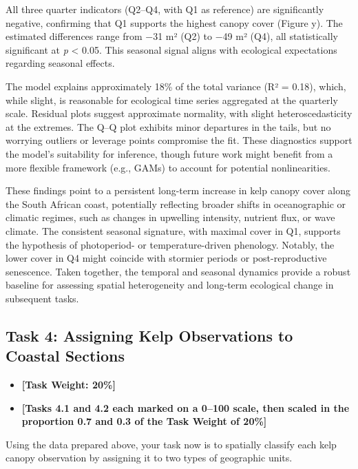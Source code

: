 \documentclass[
  british,
  10pt,
]{article}
\providecommand{\tightlist}{%
  \setlength{\itemsep}{0pt}\setlength{\parskip}{0pt}}
\begin{document}
All three quarter indicators (Q2--Q4, with Q1 as reference) are
significantly negative, confirming that Q1 supports the highest canopy
cover (Figure y). The estimated differences range from −31 m² (Q2) to
−49 m² (Q4), all statistically significant at \emph{p} \textless{} 0.05.
This seasonal signal aligns with ecological expectations regarding
seasonal effects.

The model explains approximately 18\% of the total variance (R² = 0.18),
which, while slight, is reasonable for ecological time series aggregated
at the quarterly scale. Residual plots suggest approximate normality,
with slight heteroscedasticity at the extremes. The Q--Q plot exhibits
minor departures in the tails, but no worrying outliers or leverage
points compromise the fit. These diagnostics support the model's
suitability for inference, though future work might benefit from a more
flexible framework (e.g., GAMs) to account for potential nonlinearities.

These findings point to a persistent long-term increase in kelp canopy
cover along the South African coast, potentially reflecting broader
shifts in oceanographic or climatic regimes, such as changes in
upwelling intensity, nutrient flux, or wave climate. The consistent
seasonal signature, with maximal cover in Q1, supports the hypothesis of
photoperiod- or temperature-driven phenology. Notably, the lower cover
in Q4 might coincide with stormier periods or post-reproductive
senescence. Taken together, the temporal and seasonal dynamics provide a
robust baseline for assessing spatial heterogeneity and long-term
ecological change in subsequent tasks.

\subsection{Task 4: Assigning Kelp Observations to Coastal
Sections}\label{task-4-assigning-kelp-observations-to-coastal-sections}

\begin{itemize}
\tightlist
\item
  \textbf{{[}Task Weight: 20\%{]}}
\item
  \textbf{{[}Tasks 4.1 and 4.2 each marked on a 0--100 scale, then
  scaled in the proportion 0.7 and 0.3 of the Task Weight of 20\%{]}}
\end{itemize}

Using the data prepared above, your task now is to spatially classify
each kelp canopy observation by assigning it to two types of geographic
units.
\end{document}
